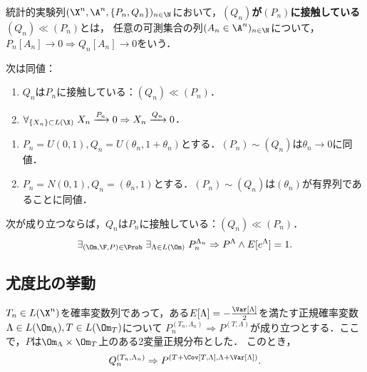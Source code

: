 \documentclass[uplatex,dvipdfmx]{jsreport}
\begin{document}
\begin{definition}[contiguity]
    統計的実験列$(\X^n,\A^n,\{P_n,Q_n\})_{n\in\N}$において，\textbf{$(Q_n)$が$(P_n)$に接触している}$(Q_n)\ll(P_n)$とは，
    任意の可測集合の列$(A_n\in\A^n)_{n\in\N}$について，$P_n[A_n]\to0\Rightarrow Q_n[A_n]\to0$をいう．
\end{definition}

\begin{lemma}
    次は同値：
    \begin{enumerate}
        \item $Q_n$は$P_n$に接触している：$(Q_n)\ll(P_n)$．
        \item $\forall_{\{X_n\}\subset L(\X)}\;X_n\xrightarrow{P_n}0\Rightarrow X_n\xrightarrow{Q_n}0$．
    \end{enumerate}
\end{lemma}

\begin{example}\mbox{}
    \begin{enumerate}
        \item $P_n=U(0,1),Q_n=U(\theta_n,1+\theta_n)$とする．$(P_n)\sim(Q_n)$は$\theta_n\to0$に同値．
        \item $P_n=N(0,1),Q_n=(\theta_n,1)$とする．$(P_n)\sim (Q_n)$は$(\theta_n)$が有界列であることに同値．
    \end{enumerate}
\end{example}

\begin{theorem}[接触性の十分条件]\label{thm-sufficient-condition-for-contiguity}
    次が成り立つならば，$Q_n$は$P_n$に接触している：$(Q_n)\ll(P_n)$．
    \[\exists_{(\Om,\F,P)\in\Prob}\;\exists_{\Lambda\in L(\Om)}\;P_n^{\Lambda_n}\Rightarrow P^\Lambda\land E[e^\Lambda]=1.\]
\end{theorem}

\subsection{尤度比の挙動}

\begin{theorem}\label{thm-property-of-LR}
    $T_n\in L(\X^n)$を確率変数列であって，ある$E[\Lambda]=-\frac{\Var[\Lambda]}{2}$を満たす正規確率変数$\Lambda\in L(\Om_\Lambda),T\in L(\Om_T)$について
    $P_n^{(T_n,\Lambda_n)}\Rightarrow P^{(T,\Lambda)}$が成り立つとする．ここで，$P$は$\Om_\Lambda\times\Om_T$上のある2変量正規分布とした．
    このとき，
    \[Q_n^{(T_n,\Lambda_n)}\Rightarrow P^{(T+\Cov[T,\Lambda],\Lambda+\Var[\Lambda])}.\]
\end{theorem}
\end{document}
